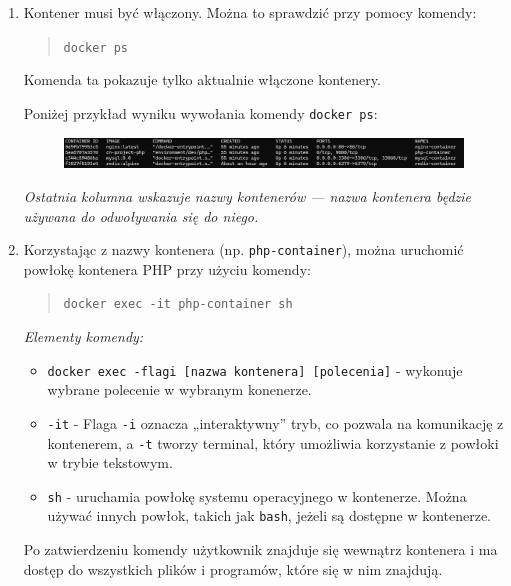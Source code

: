 \begin{enumerate} 
    \item Kontener musi być włączony. Można to sprawdzić przy pomocy komendy: 
    \begin{quote} 
        \texttt{docker ps} 
    \end{quote} Komenda ta pokazuje tylko aktualnie włączone kontenery.
    
    Poniżej przykład wyniku wywołania komendy \texttt{docker ps}:
    \begin{figure}[h]
        \centering
        \includegraphics[width=\textwidth]{images/docker_ps.png}
    \end{figure}

    \textit{Ostatnia kolumna wskazuje nazwy kontenerów — nazwa kontenera będzie używana do odwoływania się do niego.}

    \item Korzystając z nazwy kontenera (np. \texttt{php-container}), można uruchomić powłokę kontenera PHP przy użyciu komendy:
    \begin{quote}
        \texttt{docker exec -it php-container sh}
    \end{quote}
    
    \textit{Elementy komendy:}
    \begin{itemize}
        \item \verb|docker exec -flagi [nazwa kontenera] [polecenia]| - wykonuje wybrane polecenie w wybranym konenerze. 
        \item \verb|-it| - Flaga \verb|-i| oznacza „interaktywny” tryb, co pozwala na komunikację z kontenerem, a \verb|-t| tworzy terminal, który umożliwia korzystanie z powłoki w trybie tekstowym.
        \item \verb|sh| - uruchamia powłokę systemu operacyjnego w kontenerze. Można używać innych powłok, takich jak \verb|bash|, jeżeli są dostępne w kontenerze.
    \end{itemize}
    
    Po zatwierdzeniu komendy użytkownik znajduje się wewnątrz kontenera i ma dostęp do wszystkich plików i programów, które się w nim znajdują.
\end{enumerate}